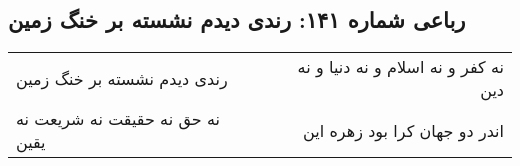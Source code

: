 \begin{center}
\section*{رباعی شماره ۱۴۱: رندی دیدم نشسته بر خنگ زمین}
\label{sec:sh141}
\begin{longtable}{l p{0.5cm} r}
رندی دیدم نشسته بر خنگ زمین
&&
نه کفر و نه اسلام و نه دنیا و نه دین
\\
نه حق نه حقیقت نه شریعت نه یقین
&&
اندر دو جهان کرا بود زهره این
\\
\end{longtable}
\end{center}
